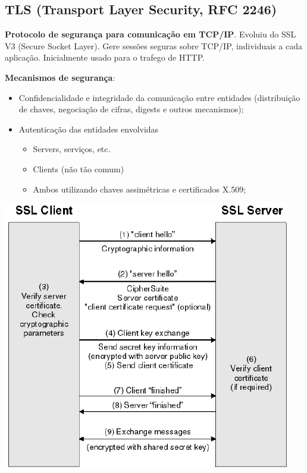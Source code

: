 \documentclass{article}
\begin{document}
\subsection{TLS (Transport Layer Security, RFC 2246)}

\begin{flushleft}
  \textbf{Protocolo de segurança para comunicação em TCP/IP}.
  Evoluiu do SSL V3 (Secure Socket Layer). Gere sessões seguras sobre
  TCP/IP, individuais a cada aplicação. Inicialmente usado para o trafego
  de HTTP.

  \vspace{2mm}

  \textbf{Mecanismos de segurança}:
  \begin{itemize}
    \item Confidencialidade e integridade da comunicação entre entidades
    (distribuição de chaves, negociação de cifras, digests e outros mecanismos);
    \item Autenticação das entidades envolvidas
    \begin{itemize}
      \item Servers, serviços, etc.
      \item Clients (não tão comum)
      \item Ambos utilizando chaves assimétricas e certificados X.509;
    \end{itemize}
  \end{itemize}
\end{flushleft}

\pagebreak

\begin{center}
  \includegraphics[scale=0.6]{26}
\end{center}
\end{document}

